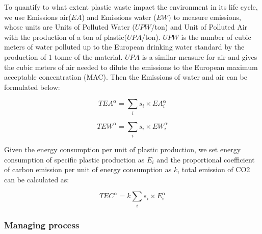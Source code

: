 \documentclass{mcmthesis}
\begin{document}
To quantify to what extent plastic waste impact the environment in its life cycle, we use Emissions air($EA$) and Emissions water ($EW$) to measure emissions, whose units are Units of Polluted Water ($UPW$/ton) and Unit of Polluted Air with the production of a ton of plastic($UPA$/ton). $UPW$ is the number of cubic meters of water polluted up to the European drinking water standard by the production of 1 tonne of the material. $UPA$ is a similar measure for air and gives the cubic meters of air needed to dilute the emissions to the European maximum acceptable concentration (MAC)\cite{book}. Then the Emissions of water and air can be formulated below:

\begin{equation}
TEA^{\alpha} = \sum_i{s_i}\times EA_i^\alpha
\label{EA}
\end{equation}

\begin{equation}
TEW^{\alpha} = \sum_i{s_i}\times EW_i^\alpha
\label{EW}
\end{equation}

Given the energy consumption per unit of plastic production, we set energy consumption of specific plastic production as $E_i$ and the proportional coefficient of carbon emission per unit of energy consumption as $k$, total emission of CO2 can be calculated as: 

\begin{equation}
TEC^\alpha = k\sum_i{s_i}\times E_i^\alpha
\label{EC}
\end{equation}





\subsubsection{Managing process}
\end{document}
